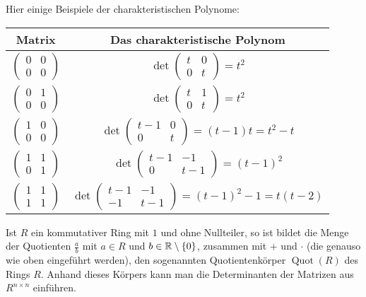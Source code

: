 \begin{bsp}
	Hier einige Beispiele der charakteristischen Polynome: 
	\begin{center}
	\begin{tabular}{c|c}
		Matrix & Das charakteristische Polynom \\
		\hline
		$ \begin{pmatrix}
			0 & 0 \\ 0 & 0
		\end{pmatrix} $ & $ \det\begin{pmatrix}
			t & 0 \\ 0 & t
		\end{pmatrix} = t^2 $ \\
		$ \begin{pmatrix}
			0 & 1 \\ 0 & 0
		\end{pmatrix} $ & $ \det\begin{pmatrix}
			t & 1 \\ 0 & t
		\end{pmatrix} = t^2 $ \\
		$ \begin{pmatrix}
			1 & 0 \\ 0 & 0
		\end{pmatrix} $ & $ \det\begin{pmatrix}
			t - 1 & 0 \\ 0 & t
		\end{pmatrix} = (t-1)t = t^2 - t $ \\
		$ \begin{pmatrix}
			1 & 1 \\ 0 & 1
		\end{pmatrix} $ & $ \det\begin{pmatrix}
			t-1 & -1 \\ 0 & t-1
		\end{pmatrix} = (t-1)^2 $ \\
		$ \begin{pmatrix}
			1 & 1 \\ 1 & 1
		\end{pmatrix} $ & $ \det\begin{pmatrix}
			t-1 & -1 \\ -1 & t-1
		\end{pmatrix} = (t-1)^2 - 1 = t(t-2) $ \\
	\end{tabular}
	\end{center}
\end{bsp}

\begin{bem}
	Ist $R$ ein kommutativer Ring mit $1$ und ohne Nullteiler, so ist bildet die Menge der Quotienten $\frac{a}{b}$ mit $a \in R$ und $b \in \mathbb R \setminus \{0\}$, zusammen mit $+$ und $\cdot$ (die genauso wie oben eingeführt werden), den sogenannten Quotientenkörper $\operatorname{Quot}(R)$ des Rings $R$. Anhand dieses Körpers kann man die Determinanten der Matrizen aus $R^{n \times n}$ einführen. 
\end{bem}


